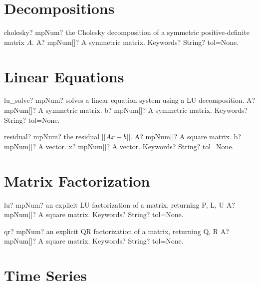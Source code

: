 \documentclass[12pt,a4paper,openany]{book}
\begin{document}
\section{Decompositions}

\begin{mpFunctionsExtract}
\mpFunctionTwo
{cholesky? mpNum? the Cholesky decomposition of a symmetric positive-definite matrix $A$.}
{A? mpNum[]? A symmetric matrix.}
{Keywords? String?  tol=None.}
\end{mpFunctionsExtract}

\section{Linear Equations}

\begin{mpFunctionsExtract}
\mpFunctionThree
{lu\_solve? mpNum? solves a linear equation system using a LU decomposition.}
{A? mpNum[]? A symmetric matrix.}
{b? mpNum[]? A symmetric matrix.}
{Keywords? String?  tol=None.}
\end{mpFunctionsExtract}

\begin{mpFunctionsExtract}
\mpFunctionFour
{residual? mpNum? the residual  $||Ax-b||$.}
{A? mpNum[]? A square matrix.}
{b? mpNum[]? A vector.}
{x? mpNum[]? A vector.}
{Keywords? String?  tol=None.}
\end{mpFunctionsExtract}

\section{Matrix Factorization}

\begin{mpFunctionsExtract}
\mpFunctionTwo
{lu? mpNum? an explicit LU factorization of a matrix, returning P, L, U}
{A? mpNum[]? A square matrix.}
{Keywords? String?  tol=None.}
\end{mpFunctionsExtract}

\begin{mpFunctionsExtract}
\mpFunctionTwo
{qr? mpNum? an explicit QR factorization of a matrix, returning Q, R}
{A? mpNum[]? A square matrix.}
{Keywords? String?  tol=None.}
\end{mpFunctionsExtract}

\section{Time Series}
\end{document}
